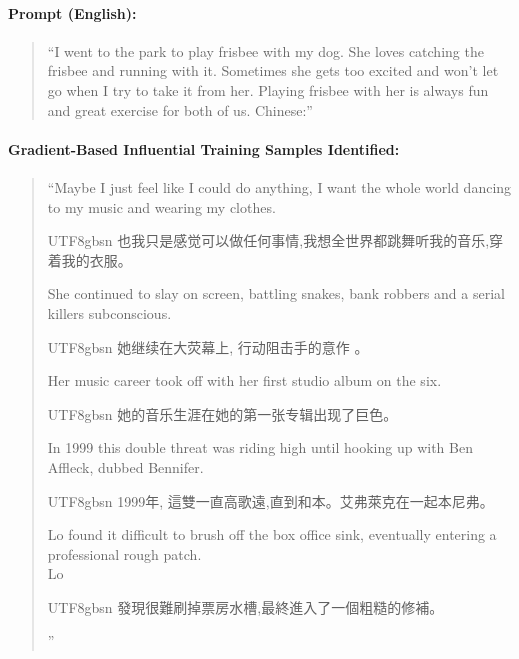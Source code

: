\begin{examplebox}
\label{ex:gradient-translation}

\paragraph{Prompt (English):}
\begin{quote}
``I went to the park to play frisbee with my dog. She loves catching the frisbee and running with it. Sometimes she gets too excited and won't let go when I try to take it from her. Playing frisbee with her is always fun and great exercise for both of us. Chinese:''
\end{quote}

\paragraph{Gradient-Based Influential Training Samples Identified:}
\begin{quote}
``Maybe I just feel like I could do anything, I want the whole world dancing to my music and wearing my clothes. \\
\begin{CJK*}{UTF8}{gbsn} 也我只是感觉可以做任何事情,我想全世界都跳舞听我的音乐,穿着我的衣服。\end{CJK*}

She continued to slay on screen, battling snakes, bank robbers and a serial killers subconscious. \\
\begin{CJK*}{UTF8}{gbsn} 她继续在大荧幕上, 行动阻击手的意作 。\end{CJK*}

Her music career took off with her first studio album on the six. \\
\begin{CJK*}{UTF8}{gbsn} 她的音乐生涯在她的第一张专辑出现了巨色。\end{CJK*}

In 1999 this double threat was riding high until hooking up with Ben Affleck, dubbed Bennifer. \\
\begin{CJK*}{UTF8}{gbsn} 1999年, 這雙一直高歌遠,直到和本。艾弗萊克在一起本尼弗。\end{CJK*}

Lo found it difficult to brush off the box office sink, eventually entering a professional rough patch. \\
Lo \begin{CJK*}{UTF8}{gbsn} 發現很難刷掉票房水槽,最終進入了一個粗糙的修補。\end{CJK*}''


\end{quote}
\end{examplebox}
